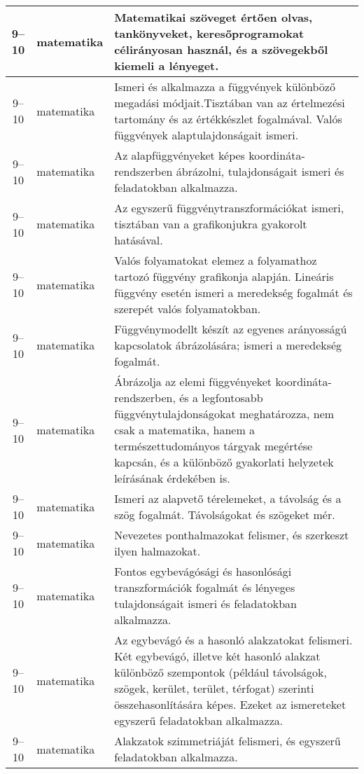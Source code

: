 \begin{small}
\begin{longtable}{c | p{2cm} |  p{11cm} }
              9--10 & matematika & Matematikai szöveget értően olvas, tankönyveket, keresőprogramokat célirányosan használ, és a szövegekből kiemeli a lényeget. \\ \hline
              9--10 & matematika & Ismeri és alkalmazza a függvények különböző megadási módjait.Tisztában van az értelmezési tartomány és az értékkészlet fogalmával. Valós függvények alaptulajdonságait ismeri. \\ \hline
              9--10 & matematika & Az alapfüggvényeket képes koordináta-rendszerben ábrázolni, tulajdonságait ismeri és feladatokban alkalmazza. \\ \hline
              9--10 & matematika & Az egyszerű függvénytranszformációkat ismeri, tisztában van a grafikonjukra gyakorolt hatásával. \\ \hline
              9--10 & matematika & Valós folyamatokat elemez a folyamathoz tartozó függvény grafikonja alapján. Lineáris függvény esetén ismeri a meredekség fogalmát és szerepét valós folyamatokban. \\ \hline
              9--10 & matematika & Függvénymodellt készít az egyenes arányosságú kapcsolatok ábrázolására; ismeri a meredekség fogalmát. \\ \hline
              9--10 & matematika & Ábrázolja az elemi függvényeket koordináta-rendszerben, és a legfontosabb függvénytulajdonságokat meghatározza, nem csak a matematika, hanem a természettudományos tárgyak megértése kapcsán, és a különböző gyakorlati helyzetek leírásának érdekében is. \\ \hline
              9--10 & matematika & Ismeri az alapvető térelemeket, a távolság és a szög fogalmát. Távolságokat és szögeket mér. \\ \hline
              9--10 & matematika & Nevezetes ponthalmazokat felismer, és szerkeszt ilyen halmazokat. \\ \hline
              9--10 & matematika & Fontos egybevágósági és hasonlósági transzformációk fogalmát  és lényeges tulajdonságait ismeri és feladatokban alkalmazza. \\ \hline
              9--10 & matematika & Az egybevágó és a hasonló alakzatokat felismeri. Két egybevágó, illetve két hasonló alakzat különböző szempontok (például távolságok, szögek, kerület, terület, térfogat) szerinti összehasonlítására képes. Ezeket az ismereteket egyszerű feladatokban alkalmazza. \\ \hline
              9--10 & matematika & Alakzatok szimmetriáját felismeri, és egyszerű feladatokban alkalmazza. \\ \hline

\end{longtable}
\end{small}
